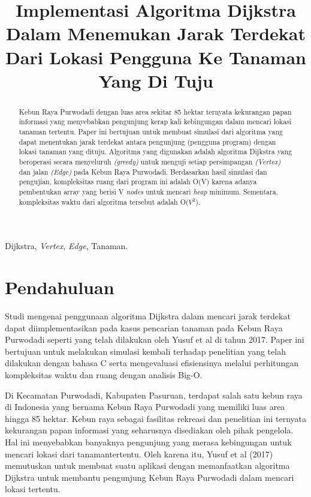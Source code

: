\documentclass[conference]{IEEEtran}
\title{Implementasi Algoritma Dijkstra Dalam Menemukan Jarak Terdekat Dari Lokasi Pengguna Ke Tanaman Yang Di Tuju}
\author{\IEEEauthorblockN{Michelle Angelina}
\IEEEauthorblockA{\textit{School of Electrical Engineering and Informatics} \\
\textit{Institut Teknologi Bandung} \\
Bandung, Indonesia\\
Email: 18320007@std.stei.itb.ac.id}
}
\begin{document}
\maketitle

	\begin{abstract}
	Kebun Raya Purwodadi dengan luas area sekitar 85 hektar ternyata kekurangan papan informasi yang menyebabkan pengunjung kerap kali kebingungan dalam mencari lokasi tanaman tertentu. Paper ini bertujuan untuk membuat simulasi dari algoritma yang dapat menentukan jarak terdekat antara pengunjung (pengguna program) dengan lokasi tanaman yang dituju. Algoritma yang digunakan adalah algoritma Dijkstra yang beroperasi secara menyeluruh \textit{(greedy)} untuk menguji setiap persimpangan \textit{(Vertex)} dan jalan \textit{(Edge)} pada Kebun Raya Purwodadi. Berdasarkan hasil simulasi dan pengujian, kompleksitas ruang dari program ini adalah O(V) karena adanya pembentukan array yang berisi V \textit{nodes} untuk mencari \textit{heap} minimum. Sementara, kompleksitas waktu dari algoritma tersebut adalah O(\begin{math} V^2 \end{math}).
	\end{abstract}

	\begin{IEEEkeywords}
		Dijkstra, \textit{Vertex}, \textit{Edge}, Tanaman.
	\end{IEEEkeywords} 

	\section{Pendahuluan}
	Studi mengenai penggunaan algoritma Dijkstra dalam mencari jarak terdekat dapat diimplementasikan pada kasus pencarian tanaman pada Kebun Raya Purwodadi seperti yang telah dilakukan oleh Yusuf et al di tahun 2017\cite{implementasi}. Paper ini bertujuan untuk melakukan simulasi kembali terhadap penelitian yang telah dilakukan dengan bahasa C serta mengevaluasi efisiensinya melalui perhitungan kompleksitas waktu dan ruang dengan analisis Big-O.

	Di Kecamatan Purwodadi, Kabupaten Pasuruan, terdapat salah satu kebun raya di Indonesia yang bernama Kebun Raya Purwodadi yang memiliki luas area hingga 85 hektar. Kebun raya sebagai fasilitas rekreasi dan penelitian ini ternyata kekurangan papan informasi yang seharusnya disediakan oleh pihak pengelola. Hal ini menyebabkan banyaknya pengunjung yang merasa kebingungan untuk mencari lokasi dari tanamantertentu. Oleh karena itu, Yusuf et al (2017) memutuskan untuk membuat suatu aplikasi dengan memanfaatkan algoritma Dijkstra untuk membantu pengunjung Kebun Raya Purwodadi dalam mencari lokasi tertentu.
\end{document}
